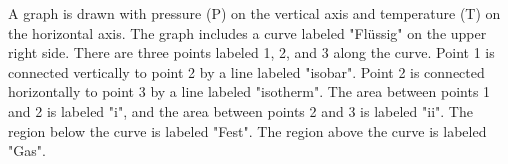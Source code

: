A graph is drawn with pressure (P) on the vertical axis and temperature (T) on the horizontal axis. The graph includes a curve labeled "Flüssig" on the upper right side. There are three points labeled 1, 2, and 3 along the curve. Point 1 is connected vertically to point 2 by a line labeled "isobar". Point 2 is connected horizontally to point 3 by a line labeled "isotherm". The area between points 1 and 2 is labeled "i", and the area between points 2 and 3 is labeled "ii". The region below the curve is labeled "Fest". The region above the curve is labeled "Gas".